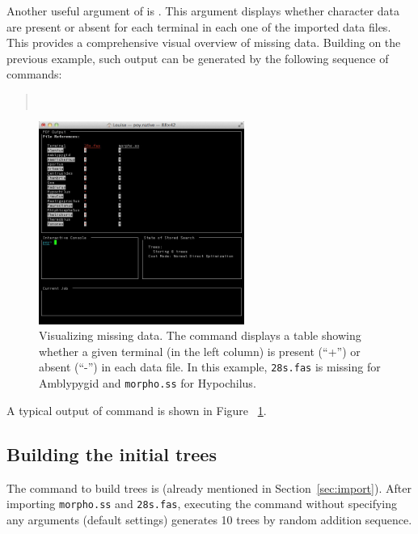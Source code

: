 {Another useful argument of  is . This argument displays whether character data are present or absent for each terminal in each one of the imported data files. This provides a comprehensive visual overview of missing data. Building on the previous example, such output can be generated by the following sequence of commands:
\begin{quote}
    \\
\end{quote}

\begin{figure}[]
    \begin{center}
        \includegraphics[width=0.6\textwidth]{doc/figures/crossref.jpg}
    \end{center}
    \caption{Visualizing missing data. The command  displays a table showing whether a given terminal (in the left column) is present (``+'') or absent (``-'') in each data file. In this example, \texttt{28s.fas} is missing for Amblypygid and \texttt{morpho.ss} for Hypochilus.}
    \label{fig:crossref}
\end{figure}

A typical output of  command is shown in Figure ~\ref{fig:crossref}.

\subsection{Building the initial trees}

The command to build trees is  (already mentioned in Section~\ref{sec:import}). After importing \texttt{morpho.ss} and \texttt{28s.fas}, executing the command  without specifying any arguments (default settings) generates 10 trees by random addition sequence.

}

